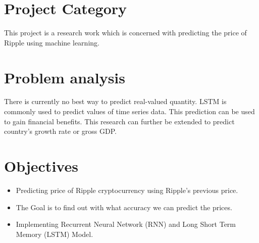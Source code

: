 \section{Project Category}
This project is a research work which is concerned with predicting the price of Ripple using machine learning.


\section{Problem analysis}
There is currently no best way to predict real-valued quantity. LSTM is commonly used to predict values of time series data. This prediction can be used to gain financial benefits. This research can further be extended to predict country's growth rate or gross GDP.


\section{Objectives}

\begin{itemize}
    \item Predicting price of Ripple cryptocurrency using Ripple's previous price.
    \item The Goal is to find out with what accuracy we can predict the prices.
    \item Implementing Recurrent Neural Network (RNN) and Long Short Term Memory (LSTM) Model.
\end{itemize}